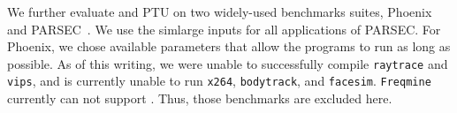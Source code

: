 \begin{table}
\centering
{}
\caption{False sharing detection results using PTU and \sheriffdetect{}. \sheriffdetect{} correctly reports only actual false sharing instances, with a performance impact;
\cmark{} indicates a correct report and \xmark{} indicates a false alarm. 
\label{table:microbenchmarks}}
\end{table}

We further evaluate \SheriffDetect{} and PTU on two widely-used benchmarks suites, Phoenix~\cite{phoenix-hpca} and PARSEC~\cite{parsec}. We use the simlarge inputs for all applications of PARSEC. For Phoenix, we chose available parameters that allow the programs to run as long as possible. As of this writing, we were unable to successfully compile \texttt{raytrace} and \texttt{vips}, and \sheriff{} is
currently unable to run \texttt{x264}, \texttt{bodytrack},
and \texttt{facesim}. \texttt{Freqmine} currently can not support \pthreads{}. Thus, those benchmarks are excluded here. 
 
